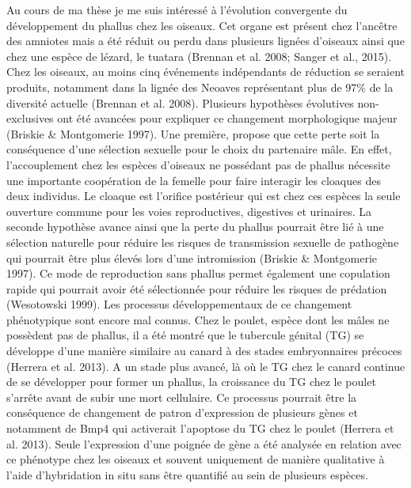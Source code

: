 Au cours de ma thèse je me suis intéressé à l’évolution convergente du développement du phallus chez les oiseaux. Cet organe est présent chez l’ancêtre des amniotes mais a été réduit ou perdu dans plusieurs lignées d’oiseaux ainsi que chez une espèce de lézard, le tuatara (Brennan et al. 2008; Sanger et al., 2015). Chez les oiseaux, au moins cinq événements indépendants de réduction se seraient produits, notamment dans la lignée des Neoaves représentant plus de 97\% de la diversité actuelle (Brennan et al. 2008). Plusieurs hypothèses évolutives non-exclusives ont été avancées pour expliquer ce changement morphologique majeur (Briskie & Montgomerie 1997). Une première, propose que cette perte soit la conséquence d’une sélection sexuelle pour le choix du partenaire mâle. En effet, l’accouplement chez les espèces d’oiseaux ne possédant pas de phallus nécessite une importante coopération de la femelle pour faire interagir les cloaques des deux individus. Le cloaque est l’orifice postérieur qui est chez ces espèces la seule ouverture commune pour les voies reproductives, digestives et urinaires. La seconde hypothèse avance ainsi que la perte du phallus pourrait être lié à une sélection naturelle pour réduire les risques de transmission sexuelle de pathogène qui pourrait être plus élevés lors d’une intromission (Briskie & Montgomerie 1997). Ce mode de reproduction sans phallus permet également une copulation rapide qui pourrait avoir été sélectionnée pour réduire les risques de prédation (Wesotowski 1999). Les processus développementaux de ce changement phénotypique sont encore mal connus. Chez le poulet, espèce dont les mâles ne possèdent pas de phallus, il a été montré que le tubercule génital (TG) se développe d’une manière similaire au canard à des stades embryonnaires précoces (Herrera et al. 2013). A un stade plus avancé, là où le TG chez le canard continue de se développer pour former un phallus, la croissance du TG chez le poulet s’arrête avant de subir une mort cellulaire. Ce processus pourrait être la conséquence de changement de patron d’expression de plusieurs gènes et notamment de Bmp4 qui activerait l’apoptose du TG chez le poulet (Herrera et al. 2013). Seule l’expression d’une poignée de gène a été analysée en relation avec ce phénotype chez les oiseaux et souvent uniquement de manière qualitative à l’aide d’hybridation in situ sans être quantifié au sein de plusieurs espèces. \\ 

